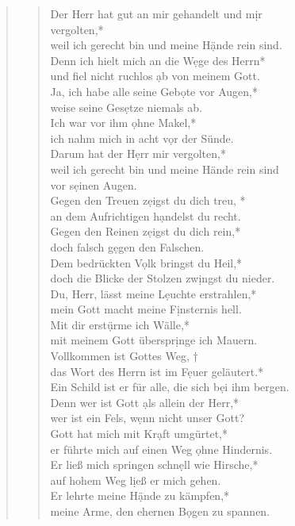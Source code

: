 \begin{quote}
\begin{verse}

Der Herr hat gut an mir gehandelt und m\d ir\\ vergolten,*\\
weil ich gerecht bin und meine H\d ände rein sind.\\ \vin
Denn ich hielt mich an die W\d ege des Herrn*\\ \vin
und fiel nicht ruchlos \d ab von meinem Gott.\\
Ja, ich habe alle seine Geb\d ote vor Augen,*\\
weise seine Ges\d etze niemals ab.\\ \vin
Ich war vor ihm \d ohne Makel,*\\ \vin
ich nahm mich in acht v\d or der Sünde.\\
Darum hat der H\d err mir vergolten,*\\
weil ich gerecht bin und meine Hände rein sind\\ vor s\d einen Augen.\\ \vin
Gegen den Treuen z\d eigst du dich treu, *\\ \vin
an dem Aufrichtigen h\d andelst du recht.\\

Gegen den Reinen z\d eigst du dich rein,*\\
doch falsch g\d egen den Falschen.\\ \vin
Dem bedrückten V\d olk bringst du Heil,*\\ \vin
doch die Blicke der Stolzen zw\d ingst du nieder.\\
Du, Herr, lässt meine L\d euchte erstrahlen,*\\
mein Gott macht meine F\d insternis hell.\\ \vin
Mit dir erst\d ürme ich Wälle,*\\ \vin
mit meinem Gott überspr\d inge ich Mauern.\\
Vollkommen ist Gottes Weg, †\\
das Wort des Herrn ist im F\d euer geläutert.*\\
Ein Schild ist er für alle, die sich b\d ei ihm bergen.\\ \vin
Denn wer ist Gott \d als allein der Herr,*\\ \vin
wer ist ein Fels, w\d enn nicht unser Gott?\\
Gott hat mich mit Kr\d aft umgürtet,*\\
er führte mich auf einen Weg \d ohne Hindernis.\\ \vin
Er ließ mich springen schn\d ell wie Hirsche,*\\ \vin
auf hohem Weg l\d ieß er mich gehen.\\
Er lehrte meine H\d ände zu kämpfen,*\\
meine Arme, den ehernen B\d ogen zu spannen.\\ \vin


\end{verse}
\end{quote}
